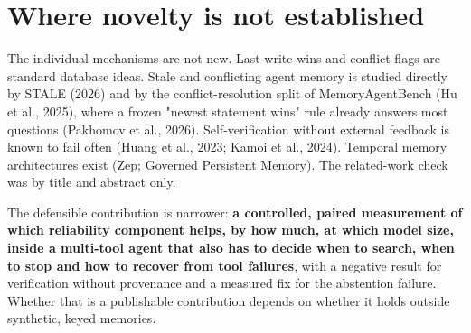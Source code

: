 \documentclass[10.5pt,a4paper,oneside]{report}
\begin{document}
\section{Where novelty is not established}
The individual mechanisms are not new. Last-write-wins and conflict flags are standard database ideas. Stale and conflicting agent memory is studied directly by STALE (2026) and by the conflict-resolution split of MemoryAgentBench (Hu et al., 2025), where a frozen "newest statement wins" rule already answers most questions (Pakhomov et al., 2026). Self-verification without external feedback is known to fail often (Huang et al., 2023; Kamoi et al., 2024). Temporal memory architectures exist (Zep; Governed Persistent Memory). The related-work check was by title and abstract only.

The defensible contribution is narrower: \textbf{a controlled, paired measurement of which reliability component helps, by how much, at which model size, inside a multi-tool agent that also has to decide when to search, when to stop and how to recover from tool failures}, with a negative result for verification without provenance and a measured fix for the abstention failure. Whether that is a publishable contribution depends on whether it holds outside synthetic, keyed memories.
\end{document}
